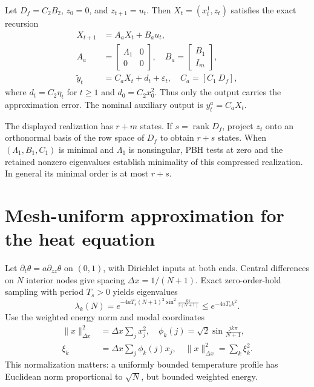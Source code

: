 \documentclass[letterpaper,10pt,conference]{ieeeconf}
\theoremstyle{remark}\newtheorem{remark}{Remark}
\begin{document}
Let $D_f=C_2B_2$, $z_0=0$, and $z_{t+1}=u_t$. Then $X_t=(x_t^1,z_t)$ satisfies the exact recursion
\begin{equation}\label{eq:aux}
\begin{split}
X_{t+1}&=A_aX_t+B_au_t,\\
A_a&=\begin{bmatrix}\Lambda_1&0\\0&0\end{bmatrix},\quad
B_a=\begin{bmatrix}B_1\\I_m\end{bmatrix},\\
\tilde y_t&=C_aX_t+d_t+\varepsilon_t,\quad C_a=[C_1\ D_f],
\end{split}
\end{equation}
where $d_t=C_2\eta_t$ for $t\ge1$ and $d_0=C_2x_0^2$. Thus only the output carries the approximation error. The nominal auxiliary output is $y_t^a=C_aX_t$.

The displayed realization has $r+m$ states. If $s=\operatorname{rank}D_f$, project $z_t$ onto an orthonormal basis of the row space of $D_f$ to obtain $r+s$ states. When $(\Lambda_1,B_1,C_1)$ is minimal and $\Lambda_1$ is nonsingular, PBH tests at zero and the retained nonzero eigenvalues establish minimality of this compressed realization. In general its minimal order is at most $r+s$.

\section{Mesh-uniform approximation for the heat equation}
Let $\partial_t\theta=a\partial_{zz}\theta$ on $(0,1)$, with Dirichlet inputs at both ends. Central differences on $N$ interior nodes give spacing $\Delta x=1/(N+1)$. Exact zero-order-hold sampling with period $T_s>0$ yields eigenvalues
\begin{equation}\label{eq:eigenvalues}
\lambda_k(N)=e^{-4aT_s(N+1)^2\sin^2\!\frac{k\pi}{2(N+1)}}
\le e^{-4aT_sk^2}.
\end{equation}
Use the weighted energy norm and modal coordinates
\begin{align*}
\|x\|_{\Delta x}^2&=\Delta x\sum_jx_j^2,\quad
\phi_k(j)=\sqrt2\sin\frac{jk\pi}{N+1},\\
\xi_k&=\Delta x\sum_j\phi_k(j)x_j,\quad
\|x\|_{\Delta x}^2=\sum_k\xi_k^2.
\end{align*}
This normalization matters: a uniformly bounded temperature profile has Euclidean norm proportional to $\sqrt N$, but bounded weighted energy.
\end{document}

